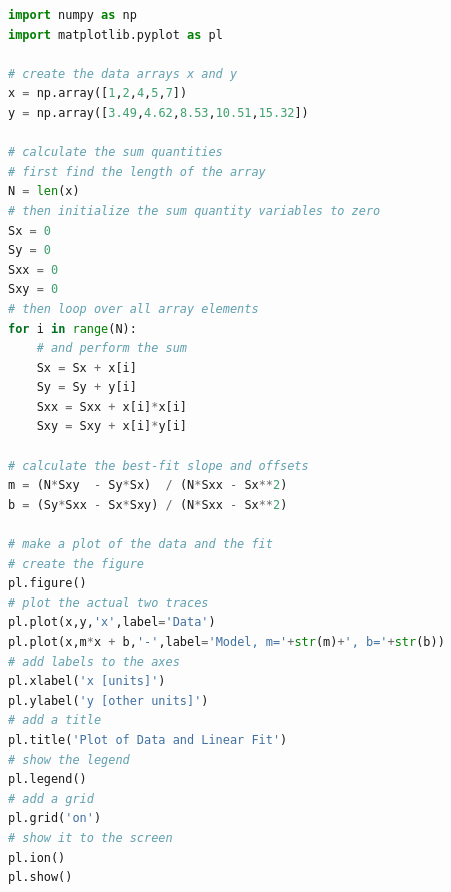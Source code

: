 \documentclass[12pt]{article}
\begin{document}
\newpage
\begin{lstlisting}[language=Python, caption={Listing of a python program to do a linear fit. Note that the line numbers in grey at the left are for reference, and should not be typed in to the program.}]
import numpy as np
import matplotlib.pyplot as pl

# create the data arrays x and y
x = np.array([1,2,4,5,7])
y = np.array([3.49,4.62,8.53,10.51,15.32])

# calculate the sum quantities
# first find the length of the array
N = len(x)
# then initialize the sum quantity variables to zero
Sx = 0
Sy = 0
Sxx = 0
Sxy = 0
# then loop over all array elements
for i in range(N):
    # and perform the sum
    Sx = Sx + x[i]
    Sy = Sy + y[i]
    Sxx = Sxx + x[i]*x[i]
    Sxy = Sxy + x[i]*y[i]

# calculate the best-fit slope and offsets
m = (N*Sxy  - Sy*Sx)  / (N*Sxx - Sx**2)
b = (Sy*Sxx - Sx*Sxy) / (N*Sxx - Sx**2)

# make a plot of the data and the fit
# create the figure
pl.figure()
# plot the actual two traces
pl.plot(x,y,'x',label='Data')
pl.plot(x,m*x + b,'-',label='Model, m='+str(m)+', b='+str(b))
# add labels to the axes
pl.xlabel('x [units]')
pl.ylabel('y [other units]')
# add a title
pl.title('Plot of Data and Linear Fit')
# show the legend
pl.legend()
# add a grid
pl.grid('on')
# show it to the screen
pl.ion()
pl.show()
\end{lstlisting}
\end{document}
